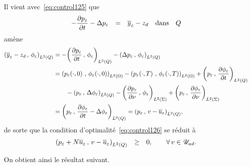 Il vient avec~\eqref{eq:control125} que
\begin{equation*}
    \begin{array}{rclll}
        -\dfrac{\partial{}p_{\varepsilon}}{\partial{}t} - \Delta p_{\varepsilon} & = & {\overline{y}}_{\varepsilon} - z_{d}
        & \text{dans} & Q
    \end{array}
\end{equation*}
amène
\begin{equation*}
    \begin{split}
         \scalaireq{%
            \bareps{y} - z_{d}
        }{%
            \fieps{}
        } & = -\scalaireq{%
            \primetemps{p_{\veps}}
        }{%
            \fieps{}
        } - \scalaireq{%
            \Delta p_{\veps}
        }{%
            \fieps{}
        }\\
        & = \scalaireohm{%
            \condinitiale{p_{\veps}}
        }{%
            \condinitiale{\fieps}
        } - \scalaireohm{%
            \condfinale{p_{\veps}}
        }{%
            \condfinale{\fieps}
        } + \scalaireq{%
            p_{\veps}
        }{%
            \primetemps{\fieps}
        }\\
        &\qquad - \scalaireq{%
            p_{\veps}
        }{%
            \Delta\fieps{}
        } - \scalaires{%
            \deriveenormale{p_{\veps}}
        }{%
            \fieps{}
        } + \scalaires{%
            p_{\veps}
        }{%
            \deriveenormale{\fieps}
        }\\
        & = \scalaireq{%
            p_{\veps}
        }{%
            \primetemps{\fieps} - \Delta\fieps{}
        } = \scalaireq{%
            p_{\veps}
        }{%
            v - \bareps{u}
        },
    \end{split}
\end{equation*}
de sorte que la condition d'optimalité~\eqref{eq:control126} se réduit à
\begin{equation*}
    \begin{array}{rcl}
        \scalaireq{%
            p_{\veps} + N\bareps{u}
        }{%
            v - \bareps{u}
        } & \geq & 0,\qquad \forall\,v\in\uad.
    \end{array}
\end{equation*}

On obtient ainsi le résultat suivant.

